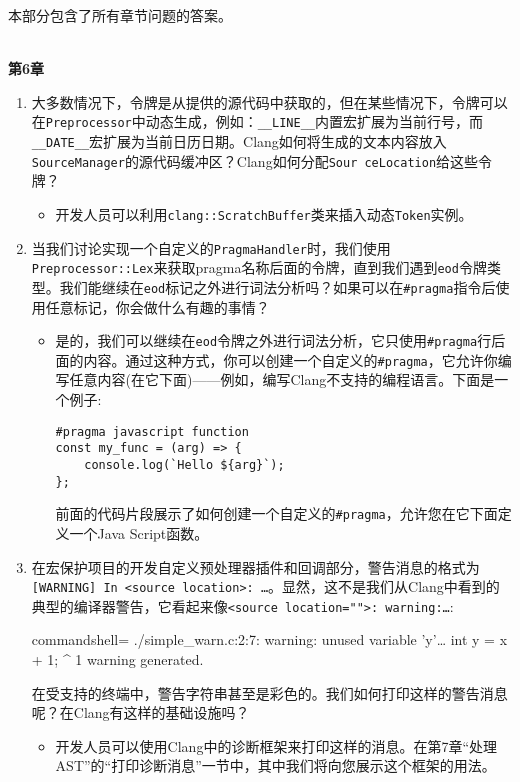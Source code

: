

本部分包含了所有章节问题的答案。

\hspace*{\fill} \\ %
\noindent
\textbf{第6章}

\begin{enumerate}
\item 大多数情况下，令牌是从提供的源代码中获取的，但在某些情况下，令牌可以在\texttt{Preprocessor}中动态生成，例如：\texttt{\_\_LINE\_\_}内置宏扩展为当前行号，而\texttt{\_\_DATE\_\_}宏扩展为当前日历日期。Clang如何将生成的文本内容放入\texttt{SourceManager}的源代码缓冲区？Clang如何分配\texttt{Sour ceLocation}给这些令牌？

\begin{itemize}
\item 开发人员可以利用\texttt{clang::ScratchBuffer}类来插入动态\texttt{Token}实例。
\end{itemize}

\item 当我们讨论实现一个自定义的\texttt{PragmaHandler}时，我们使用\texttt{Preprocessor::Lex}来获取pragma名称后面的令牌，直到我们遇到\texttt{eod}令牌类型。我们能继续在\texttt{eod}标记之外进行词法分析吗？如果可以在\texttt{\#pragma}指令后使用任意标记，你会做什么有趣的事情？

\begin{itemize}
\item 是的，我们可以继续在\texttt{eod}令牌之外进行词法分析，它只使用\texttt{\#pragma}行后面的内容。通过这种方式，你可以创建一个自定义的\texttt{\#pragma}，它允许你编写任意内容(在它下面)——例如，编写Clang不支持的编程语言。下面是一个例子:

\begin{lstlisting}[style=styleCXX]
#pragma javascript function
const my_func = (arg) => {
	console.log(`Hello ${arg}`);
};
\end{lstlisting}

前面的代码片段展示了如何创建一个自定义的\texttt{\#pragma}，允许您在它下面定义一个Java Script函数。

\end{itemize}

\item 在宏保护项目的开发自定义预处理器插件和回调部分，警告消息的格式为\texttt{[WARNING] In <source location>: …}。显然，这不是我们从Clang中看到的典型的编译器警告，它看起来像\texttt{<source location="">: warning:…}:

\begin{tcblisting}{commandshell={}}
./simple_warn.c:2:7: warning: unused variable 'y'…
int y = x + 1;
     ^
1 warning generated.
\end{tcblisting}

在受支持的终端中，警告字符串甚至是彩色的。我们如何打印这样的警告消息呢？在Clang有这样的基础设施吗？

\begin{itemize}
\item 开发人员可以使用Clang中的诊断框架来打印这样的消息。在第7章“处理AST”的“打印诊断消息”一节中，其中我们将向您展示这个框架的用法。
\end{itemize}

\end{enumerate}

